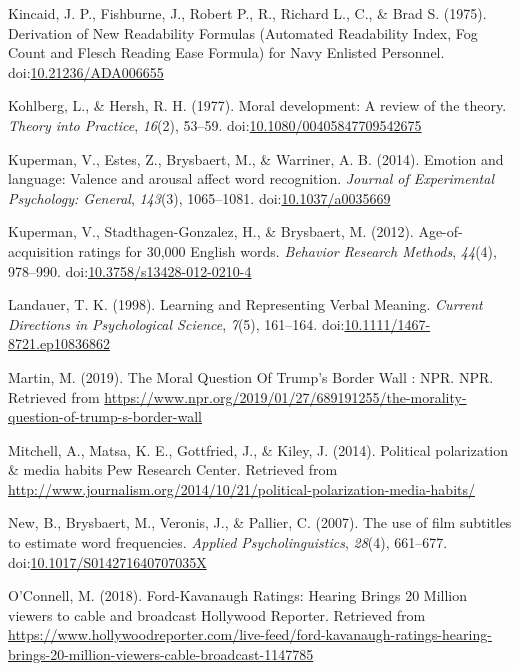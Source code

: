 \documentclass[english,,man]{apa6}
\begin{document}
\hypertarget{ref-Kincaid1975}{}
Kincaid, J. P., Fishburne, J., Robert P., R., Richard L., C., \& Brad S.
(1975). Derivation of New Readability Formulas (Automated Readability
Index, Fog Count and Flesch Reading Ease Formula) for Navy Enlisted
Personnel.
doi:\href{https://doi.org/10.21236/ADA006655}{10.21236/ADA006655}

\hypertarget{ref-Kohlberg1977}{}
Kohlberg, L., \& Hersh, R. H. (1977). Moral development: A review of the
theory. \emph{Theory into Practice}, \emph{16}(2), 53--59.
doi:\href{https://doi.org/10.1080/00405847709542675}{10.1080/00405847709542675}

\hypertarget{ref-Kuperman2014}{}
Kuperman, V., Estes, Z., Brysbaert, M., \& Warriner, A. B. (2014).
Emotion and language: Valence and arousal affect word recognition.
\emph{Journal of Experimental Psychology: General}, \emph{143}(3),
1065--1081.
doi:\href{https://doi.org/10.1037/a0035669}{10.1037/a0035669}

\hypertarget{ref-Kuperman2012}{}
Kuperman, V., Stadthagen-Gonzalez, H., \& Brysbaert, M. (2012).
Age-of-acquisition ratings for 30,000 English words. \emph{Behavior
Research Methods}, \emph{44}(4), 978--990.
doi:\href{https://doi.org/10.3758/s13428-012-0210-4}{10.3758/s13428-012-0210-4}

\hypertarget{ref-Landauer1998}{}
Landauer, T. K. (1998). Learning and Representing Verbal Meaning.
\emph{Current Directions in Psychological Science}, \emph{7}(5),
161--164.
doi:\href{https://doi.org/10.1111/1467-8721.ep10836862}{10.1111/1467-8721.ep10836862}

\hypertarget{ref-Martin2019}{}
Martin, M. (2019). The Moral Question Of Trump's Border Wall : NPR. NPR.
Retrieved from
\url{https://www.npr.org/2019/01/27/689191255/the-morality-question-of-trump-s-border-wall}

\hypertarget{ref-Mitchell2014}{}
Mitchell, A., Matsa, K. E., Gottfried, J., \& Kiley, J. (2014).
Political polarization \& media habits \textbar{} Pew Research Center.
Retrieved from
\url{http://www.journalism.org/2014/10/21/political-polarization-media-habits/}

\hypertarget{ref-New2007}{}
New, B., Brysbaert, M., Veronis, J., \& Pallier, C. (2007). The use of
film subtitles to estimate word frequencies. \emph{Applied
Psycholinguistics}, \emph{28}(4), 661--677.
doi:\href{https://doi.org/10.1017/S014271640707035X}{10.1017/S014271640707035X}

\hypertarget{ref-OConnell2018}{}
O'Connell, M. (2018). Ford-Kavanaugh Ratings: Hearing Brings 20 Million
viewers to cable and broadcast \textbar{} Hollywood Reporter. Retrieved
from
\url{https://www.hollywoodreporter.com/live-feed/ford-kavanaugh-ratings-hearing-brings-20-million-viewers-cable-broadcast-1147785}
\end{document}
